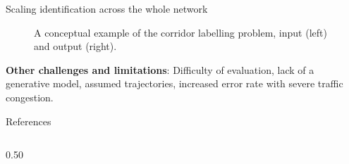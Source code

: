 \documentclass[final]{beamer}
\newlength{\colwidth}
\begin{document}
\begin{frame}[t]
\begin{columns}[t]
\begin{column}{\colwidth}
\begin{block}{Scaling identification across the whole network}
      \begin{figure}
        \centering
        \quad\quad
        \caption{A conceptual example of the corridor labelling problem, input (left) and output (right).}
        \label{fig:corridors}
      \end{figure}

      \vspace{-0.5cm}

      \textbf{Other challenges and limitations}: Difficulty of evaluation,
      lack of a generative model, assumed trajectories, increased error rate
      with severe traffic congestion.

  \end{block}

  \begin{block}{References}

    \vspace{-0.20cm}

    \footnotesize{
      
    }

    \vspace{-0.25cm}

  \end{block}

  \begin{columns}[t] %

    \begin{column}{0.50\colwidth}


\end{column}
\end{columns}
\end{column}
\end{columns}
\end{frame}
\end{document}
